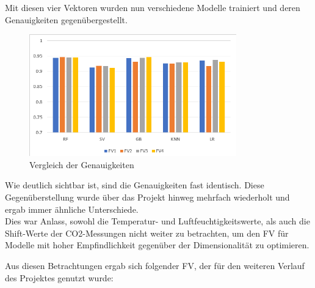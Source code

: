Mit diesen vier Vektoren wurden nun verschiedene Modelle trainiert und deren Genauigkeiten gegenübergestellt.

\begin{figure}[h]
    \centering
    \includegraphics[width=0.8\textwidth]{pic/FV_comp.png}
    \caption{Vergleich der Genauigkeiten}
    \label{fig:FV_comp}
\end{figure}

Wie deutlich sichtbar ist, sind die Genauigkeiten fast identisch. Diese Gegenüberstellung wurde über das Projekt
hinweg mehrfach wiederholt und ergab immer ähnliche Unterschiede.\\
Dies war Anlass, sowohl die Temperatur- und Luftfeuchtigkeitswerte, als auch die Shift-Werte der CO2-Messungen 
nicht weiter zu betrachten, um den FV für Modelle mit hoher Empfindlichkeit gegenüber der Dimensionalität zu 
optimieren.

\newpage
Aus diesen Betrachtungen ergab sich folgender FV, der für den weiteren Verlauf des Projektes genutzt wurde:\\

